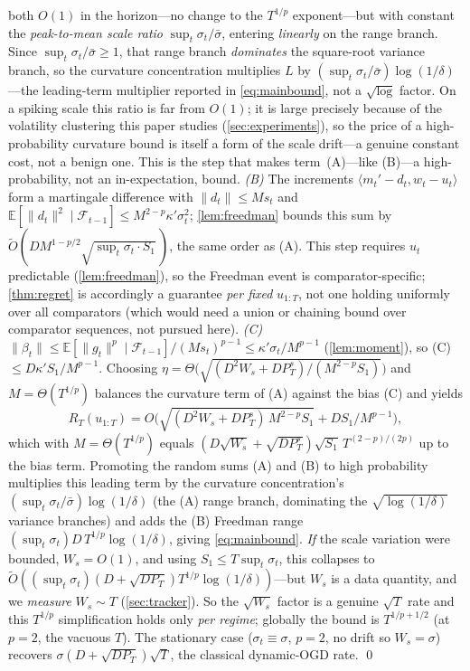 \documentclass{article}
\newcommand{\E}{\mathbb{E}}
\newcommand{\ip}[2]{\langle #1, #2 \rangle}
\newcommand{\norm}[1]{\lVert #1 \rVert}
\newcommand{\gt}{g_t}
\begin{document}
both $O(1)$ in the horizon---no change to the $T^{1/p}$ exponent---but with constant the
\emph{peak-to-mean scale ratio} $\sup_t\sigma_t/\bar\sigma$, entering \emph{linearly} on the
range branch. Since $\sup_t\sigma_t/\bar\sigma\ge1$, that range branch \emph{dominates} the
square-root variance branch, so the curvature concentration multiplies $L$ by
$(\sup_t\sigma_t/\bar\sigma)\log(1/\delta)$---the leading-term multiplier reported in
\eqref{eq:mainbound}, not a $\sqrt{\log}$ factor. On a spiking scale this ratio is far from
$O(1)$; it is large precisely because of the volatility clustering this paper studies
(\cref{sec:experiments}), so the price of a high-probability curvature bound is itself a form
of the scale drift---a genuine constant cost, not a benign one. This is the step that makes
term~(A)---like (B)---a high-probability, not an in-expectation, bound.
\emph{(B)} The increments $\ip{m_t'-d_t}{w_t-u_t}$ form a martingale difference with
$\norm{d_t}\le Ms_t$ and $\E[\norm{d_t}^2\mid\mathcal F_{t-1}]\le M^{2-p}\kappa'
\sigma_t^2$; \cref{lem:freedman} bounds this sum by
$\tilde O(D M^{1-p/2}\sqrt{\sup_t\sigma_t\cdot S_1}\,)$, the same order as (A). This step
requires $u_t$ predictable (\cref{lem:freedman}), so the Freedman event is
comparator-specific; \cref{thm:regret} is accordingly a guarantee \emph{per fixed}
$u_{1:T}$, not one holding uniformly over all comparators (which would need a union or
chaining bound over comparator sequences, not pursued here).
\emph{(C)} $\norm{\beta_t}\le\E[\norm{\gt}^p\mid\mathcal F_{t-1}]/(Ms_t)^{p-1}\le
\kappa'\sigma_t/M^{p-1}$ (\cref{lem:moment}), so (C) $\le D\kappa'S_1/M^{p-1}$.
Choosing $\eta=\Theta\bigl(\sqrt{(D^2W_s+D P_T^s)/(M^{2-p}S_1)}\bigr)$ and
$M=\Theta(T^{1/p})$ balances the curvature term of (A) against the bias (C) and yields
\begin{equation*}
R_T(u_{1:T})=O\bigl(\sqrt{(D^2W_s+D P_T^s)\,M^{2-p}S_1}+D S_1/M^{p-1}\bigr),
\end{equation*}
which with $M=\Theta(T^{1/p})$ equals $(D\sqrt{W_s}+\sqrt{D P_T^s})\sqrt{S_1}\,
T^{(2-p)/(2p)}$ up to the bias term. Promoting the random sums (A) and (B) to high probability
multiplies this leading term by the curvature concentration's
$(\sup_t\sigma_t/\bar\sigma)\log(1/\delta)$ (the (A) range branch, dominating the
$\sqrt{\log(1/\delta)}$ variance branches) and adds the (B) Freedman range
$(\sup_t\sigma_t)D\,T^{1/p}\log(1/\delta)$, giving \eqref{eq:mainbound}. \emph{If} the scale
variation were bounded,
$W_s=O(1)$, and using $S_1\le T\sup_t\sigma_t$, this collapses to
$\tilde O((\sup_t\sigma_t)(D+\sqrt{D P_T})T^{1/p}\log(1/\delta))$---but $W_s$ is a data
quantity, and we \emph{measure} $W_s\sim T$ (\cref{sec:tracker}). So the $\sqrt{W_s}$
factor is a genuine $\sqrt T$ rate and this $T^{1/p}$ simplification holds only \emph{per
regime}; globally the bound is $T^{1/p+1/2}$ (at $p=2$, the vacuous $T$). The stationary
case ($\sigma_t\equiv\sigma$, $p=2$, no drift so $W_s=\sigma$) recovers
$\sigma(D+\sqrt{DP_T})\sqrt T$, the classical dynamic-OGD rate. \qed
\end{document}

